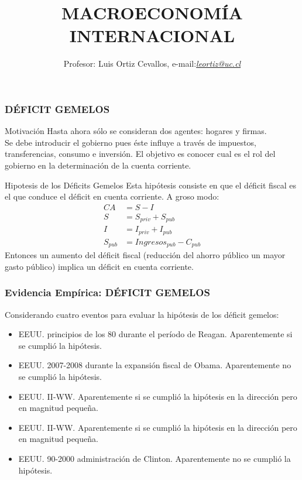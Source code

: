 \documentclass[10pt, xcolor=table, x11names]{beamer}
\author[Luis Ortiz Cevallos e-mail: \href{leortiz@uc.cl}{\textit{leortiz@uc.cl}}]{Profesor: Luis Ortiz Cevallos, e-mail:\href{leortiz@uc.cl}{\textit{leortiz@uc.cl}} }
\title[MACRO INTERNACIONAL]{\vspace*{1.0em} MACROECONOMÍA INTERNACIONAL}
\date[\href{https://ortiz-cevallos.github.io/luisortiz.github.io/ }{\textit{https://ortiz-cevallos.github.io/luisortiz.github.io/}}]{}
\begin{document}
\begin{frame}
\titlepage
\end{frame}


\begin{frame}[label=1]
	\frametitle{{\normalsize DÉFICIT GEMELOS} {}}
	\begin{block} {Motivación}
		Hasta ahora sólo se consideran dos agentes: hogares y firmas.\\
		Se debe introducir el gobierno pues éste influye a través de impuestos, transferencias, consumo e inversión. El objetivo es conocer cual es el rol del gobierno en la determinación de la cuenta corriente. 
	\end{block}	
	\begin{block}{Hipotesis de los Déficits Gemelos}
		Esta hipótesis consiste en que el déficit fiscal es el que conduce el déficit en cuenta corriente. A groso modo:
		\begin{align}
		CA&=S-I\nonumber \\
		S&=S_{priv}+S_{pub}\nonumber \\
		I&=I_{priv}+I_{pub}\nonumber \\
		S_{pub}&=Ingresos_{pub}-C_{pub}
		\end{align}
		Entonces un aumento del déficit fiscal (reducción del ahorro público un mayor gasto público) implica un déficit en cuenta corriente.
	\end{block} 
\end{frame}

\begin{frame}[label=2]
	\frametitle{{\normalsize Evidencia Empírica: DÉFICIT GEMELOS} {}}
	Considerando cuatro eventos para evaluar la hipótesis de los déficit gemelos:
	\begin{itemize}
		\item EEUU. principios de los 80 durante el período de Reagan. Aparentemente si se cumplió la hipótesis.
		\item EEUU. 2007-2008 durante la expansión fiscal de Obama. Aparentemente no se cumplió la hipótesis.
		\item EEUU. II-WW. Aparentemente si se cumplió la hipótesis en la dirección pero en magnitud pequeña.
		\item EEUU. II-WW. Aparentemente si se cumplió la hipótesis en la dirección pero en magnitud pequeña.
		\item EEUU. 90-2000 administración de Clinton. Aparentemente no se cumplió la hipótesis. 
		
		\end{itemize}
	
\end{frame}
\end{document}

